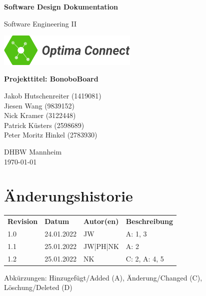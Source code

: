 \documentclass[a4paper,11pt]{scrartcl}
\begin{document}
\renewcommand*{\arraystretch}{1.2}
\begin{titlepage}
    \begin{center}
        \vspace*{1cm}\Huge
        \textbf{Software Design Dokumentation}\par                
        \vspace{0.5cm}\LARGE        
        Software Engineering II\par           
        \vspace{2cm}
        \includegraphics[width=0.5\textwidth]{OptimaLogo_long}\par   
        \vspace{1cm}
        \textbf{Projekttitel: BonoboBoard}\par        
        \vfill\Large   
        Jakob Hutschenreiter (1419081)\\Jiesen Wang (9839152)\\Nick Kramer (3122448)\\Patrick Küsters (2598689)\\Peter Moritz Hinkel (2783930)\par
        \vspace{2cm}
        DHBW Mannheim\\
        \today     
    \end{center}
\end{titlepage}

\section*{Änderungshistorie}
\begin{table}[h]
	\begin{tabular}{@{} p{20mm} p{25mm} p{25mm} p{75mm}}
		\textbf{Revision} & \textbf{Datum} & \textbf{Autor(en)} & \textbf{Beschreibung}\\
		1.0 & 24.01.2022 & JW & A: 1, 3 \\ 
		1.1 & 25.01.2022 & JW|PH|NK & A: 2  \\ 
		1.2 & 25.01.2022 & NK & C: 2, A: 4, 5  \\ 
	\end{tabular}
\end{table}
\noindent
Abkürzungen: Hinzugefügt/Added (A), Änderung/Changed (C), Löschung/Deleted (D)
\vspace{2cm}
\tableofcontents
\newpage
{}
\end{document}
